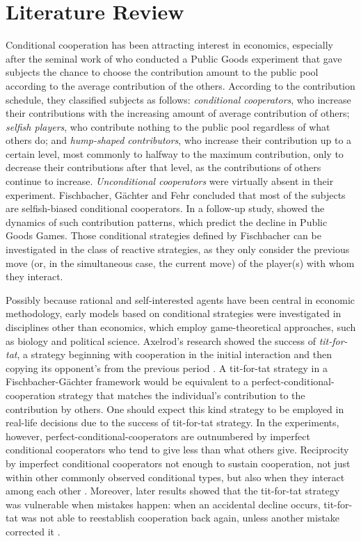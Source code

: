 \documentclass[12pt]{article}
\begin{document}
\section{Literature Review}

Conditional cooperation has been attracting interest in economics, especially after the seminal work of \citet{Fischbacher2001} who conducted a Public Goods experiment that gave subjects the chance to choose the contribution amount to the public pool according to the average contribution of the others. According to the contribution schedule, they classified subjects as follows: \textit{conditional cooperators}, who increase their contributions with the increasing amount of average contribution of others; \textit{selfish players}, who contribute nothing to the public pool regardless of what others do; and \textit{hump-shaped contributors}, who increase their contribution up to a certain level, most commonly to halfway to the maximum contribution, only to decrease their contributions after that level, as the contributions of others continue to increase. \textit{Unconditional cooperators} were virtually absent in their experiment. Fischbacher, G{\"a}chter and Fehr concluded that most of the subjects are selfish-biased conditional cooperators. In a follow-up study, \citet{Fischbacher2010} showed the dynamics of such contribution patterns, which predict the decline in Public Goods Games. Those conditional strategies defined by Fischbacher can be investigated in the class of reactive strategies, as they only consider the previous move (or, in the simultaneous case, the current move) of the player(s) with whom they interact. 

Possibly because rational and self-interested agents have been central in economic methodology, early models based on conditional strategies were investigated in disciplines other than economics, which employ game-theoretical approaches, such as biology and political science. Axelrod's research showed the success of \textit{tit-for-tat}, a strategy beginning with cooperation in the initial interaction and then copying its opponent's from the previous period \citep{Axelrod1980a, Axelrod1980b, Axelrod1981-ot}.  A tit-for-tat strategy in a Fischbacher-G{\"a}chter framework would be  equivalent to a perfect-conditional-cooperation strategy that matches the individual's contribution to the contribution by others. One should expect this kind strategy to be employed in real-life decisions due to the success of tit-for-tat strategy. In the experiments, however, perfect-conditional-cooperators are outnumbered by imperfect conditional cooperators who tend to give less than what others give. Reciprocity by imperfect conditional cooperators not enough to sustain cooperation, not just within other commonly observed conditional types, but also when they interact among each other \citep{Fischbacher2010}.  Moreover, later results showed that the tit-for-tat strategy was vulnerable when mistakes happen: when an accidental decline occurs, tit-for-tat was not able to reestablish cooperation back again, unless another mistake corrected it \citep{Hirshleifer1988-fh, Selten1984-sb, Fundenberg1990-up, Nowak1993-gl}.
\end{document}
